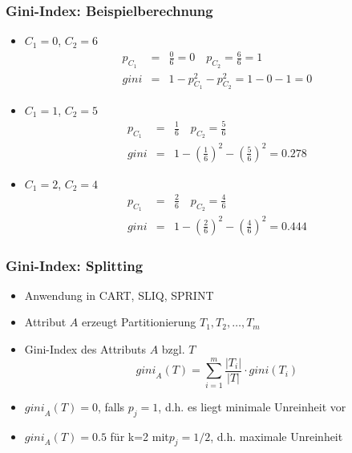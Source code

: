 \begin{frame}
\frametitle{Gini-Index: Beispielberechnung}

\begin{itemize}
\item $C_1 = 0$, $C_2 = 6$
\begin{eqnarray*}
p_{C_1}&=&\frac{0}{6} = 0 \quad p_{C_2}=\frac{6}{6}=1\\
\textit{gini}&=&1-p_{C_1}^2 - p_{C_2}^2=1-0-1=0
\end{eqnarray*}
\item $C_1 = 1$, $C_2 = 5$
\begin{eqnarray*}
p_{C_1}&=&\frac{1}{6} \quad p_{C_2}=\frac{5}{6}\\
\textit{gini}&=&1-(\frac{1}{6})^2-(\frac{5}{6})^2=0.278
\end{eqnarray*}
\item $C_1 = 2$, $C_2 = 4$
\begin{eqnarray*}
p_{C_1}&=&\frac{2}{6} \quad p_{C_2}=\frac{4}{6}\\
\textit{gini}&=&1-(\frac{2}{6})^2-(\frac{4}{6})^2=0.444
\end{eqnarray*}
\end{itemize}

\end{frame}


\begin{frame}
\frametitle{Gini-Index: Splitting}

\begin{itemize}
\item Anwendung in CART, SLIQ, SPRINT
\item Attribut $A$ erzeugt Partitionierung $T_1, T_2, \dots, T_m$
\item Gini-Index des Attributs $A$ bzgl. $T$
$$
\textit{gini}_A(T) = \sum_{i=1}^m \frac{|T_i|}{|T|} \cdot
\textit{gini}(T_i)
$$
\item $\textit{gini}_A(T) = 0$, falls $p_j=1$, d.h. es liegt minimale Unreinheit vor
\item $\textit{gini}_A(T) = 0.5$ für k=2 mit$p_j=1/2$, d.h. maximale Unreinheit
\end{itemize}
\end{frame}




